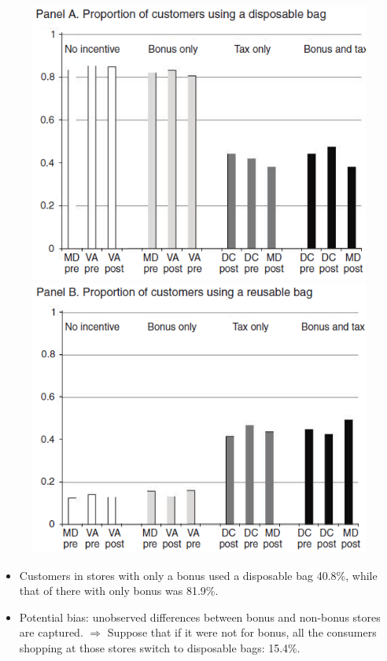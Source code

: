 \documentclass[dvipdfmx,11pt]{beamer}
\begin{document}
\begin{frame}\frametitle{}
  \begin{figure}[ht]
    \centering
    \includegraphics[scale = .5]{0807tanji/F4A}
    \includegraphics[scale = .5]{0807tanji/F4B}
  \end{figure}
  \begin{itemize}
    \small
    \item Customers in stores with only a bonus used a disposable bag 40.8\%, while that of there with only bonus was 81.9\%.
    \item Potential bias: unobserved differences between bonus and non-bonus stores are captured.
    $\Rightarrow$ Suppose that if it were not for bonus, all the consumers shopping at those stores switch to disposable bags: 15.4\%.
  \end{itemize}
\end{frame}
\end{document}
